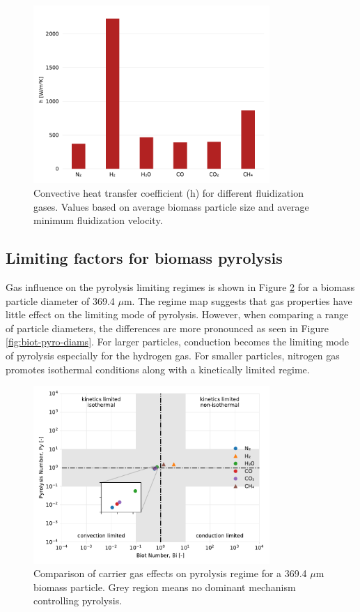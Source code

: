 \documentclass{article}
\begin{document}
\begin{figure}[H]
    \centering
    \includegraphics[width=0.8\textwidth]{figures/biomass_hconv.pdf}
    \caption{Convective heat transfer coefficient (h) for different fluidization gases. Values based on average biomass particle size and average minimum fluidization velocity.}
    \label{fig:biomass-hconv}
\end{figure}

\subsection{Limiting factors for biomass pyrolysis}

Gas influence on the pyrolysis limiting regimes is shown in Figure \ref{fig:biot-pyro-gases} for a biomass particle diameter of 369.4 $\mu$m. The regime map suggests that gas properties have little effect on the limiting mode of pyrolysis. However, when comparing a range of particle diameters, the differences are more pronounced as seen in Figure \ref{fig:biot-pyro-diams}. For larger particles, conduction becomes the limiting mode of pyrolysis especially for the hydrogen gas. For smaller particles, nitrogen gas promotes isothermal conditions along with a kinetically limited regime.

\begin{figure}[H]
    \centering
    \includegraphics[width=0.8\textwidth]{figures/biot-pyro-gases.pdf}
    \caption{Comparison of carrier gas effects on pyrolysis regime for a 369.4 $\mu$m biomass particle. Grey region means no dominant mechanism controlling pyrolysis.}
    \label{fig:biot-pyro-gases}
\end{figure}
\end{document}
